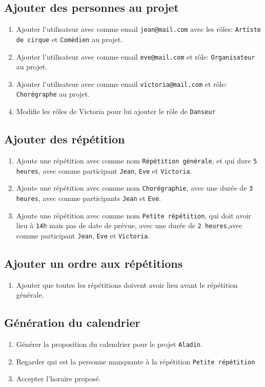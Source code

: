 \documentclass[11pt]{article}
\begin{document}
\subsection{Ajouter des personnes au projet}
\begin{enumerate}
    \item Ajouter l'utilisateur avec comme email \texttt{jean@mail.com} avec les rôles: \texttt{Artiste de cirque} et \texttt{Comédien} au projet.
    \item Ajouter l'utilisateur avec comme email \texttt{eve@mail.com} et rôle: \texttt{Organisateur} au projet.
    \item Ajouter l'utilisateur avec comme email \texttt{victoria@mail.com} et rôle: \texttt{Chorégraphe} au projet.
    \item Modifie les rôles de Victoria pour lui ajouter le rôle de \texttt{Danseur}
\end{enumerate}
\subsection{Ajouter des répétition}
\begin{enumerate}
    \item Ajoute une répétition avec comme nom \texttt{Répétition générale}, et qui dure \texttt{5 heures}, avec comme participant \texttt{Jean}, \texttt{Eve} et \texttt{Victoria}.
    \item Ajoute une répétition avec comme nom \texttt{Chorégraphie}, avec une durée de \texttt{3 heures}, avec comme participants \texttt{Jean} et \texttt{Eve}.
    \item Ajoute une répétition avec comme nom \texttt{Petite répétition}, qui doit avoir lieu à \texttt{14h} mais pas de date de prévue, avec une durée de \texttt{2 heures},avec comme participant \texttt{Jean}, \texttt{Eve} et \texttt{Victoria}.
\end{enumerate}
\subsection{Ajouter un ordre aux répétitions}
\begin{enumerate}
    \item Ajouter que toutes les répétitions doivent avoir lieu avant le répétition générale.
\end{enumerate}
\subsection{Génération du calendrier}
\begin{enumerate}
    \item Générer la proposition du calendrier pour le projet \texttt{Aladin}.
    \item Regarder qui est la personne manquante à la répétition \texttt{Petite répétition} 
    \item Accepter l'horaire proposé.
\end{enumerate}
\end{document}
